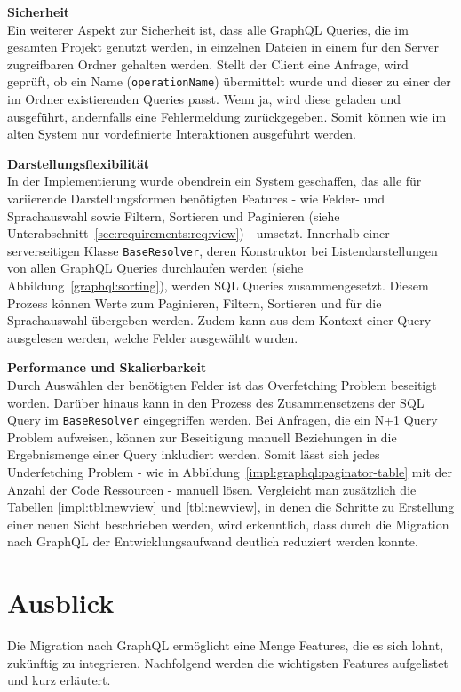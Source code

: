 \textbf{Sicherheit} \ \\
Ein weiterer Aspekt zur Sicherheit ist, dass alle GraphQL Queries, die im gesamten Projekt genutzt werden, in einzelnen Dateien in einem für den Server zugreifbaren Ordner gehalten werden. 
Stellt der Client eine Anfrage, wird geprüft, ob ein Name (\texttt{operationName}) übermittelt wurde und dieser zu einer der im Ordner existierenden Queries passt. Wenn ja, wird diese geladen und ausgeführt, andernfalls eine Fehlermeldung zurückgegeben. Somit können wie im alten System nur vordefinierte Interaktionen ausgeführt werden.

\textbf{Darstellungsflexibilität} \ \\
In der Implementierung wurde obendrein ein System geschaffen, das alle für variierende Darstellungsformen benötigten Features - wie Felder- und Sprachauswahl sowie Filtern, Sortieren und Paginieren (siehe Unterabschnitt~\ref{sec:requirements:req:view}) - umsetzt. Innerhalb einer serverseitigen Klasse \texttt{BaseResolver}, deren Konstruktor bei Listendarstellungen von allen GraphQL Queries durchlaufen werden (siehe Abbildung~\ref{graphql:sorting}), werden SQL Queries zusammengesetzt. Diesem Prozess können Werte zum Paginieren, Filtern, Sortieren und für die Sprachauswahl übergeben werden. Zudem kann aus dem Kontext einer Query ausgelesen werden, welche Felder ausgewählt wurden.

\textbf{Performance und Skalierbarkeit} \ \\
Durch Auswählen der benötigten Felder ist das Overfetching Problem beseitigt worden.
Darüber hinaus kann in den Prozess des Zusammensetzens der SQL Query im \texttt{BaseResolver} eingegriffen werden. Bei Anfragen, die ein N+1 Query Problem aufweisen, können zur Beseitigung manuell Beziehungen in die Ergebnismenge einer Query inkludiert werden. Somit lässt sich jedes Underfetching Problem - wie in Abbildung~\ref{impl:graphql:paginator-table} mit der Anzahl der Code Ressourcen - manuell lösen.
Vergleicht man zusätzlich die Tabellen \ref{impl:tbl:newview} und \ref{tbl:newview}, in denen die Schritte zu Erstellung einer neuen Sicht beschrieben werden, wird erkenntlich, dass durch die Migration nach GraphQL der Entwicklungsaufwand deutlich reduziert werden konnte. 


\section{Ausblick}
Die Migration nach GraphQL ermöglicht eine Menge Features, die es sich lohnt, zukünftig zu integrieren.
Nachfolgend werden die wichtigsten Features aufgelistet und kurz erläutert.

